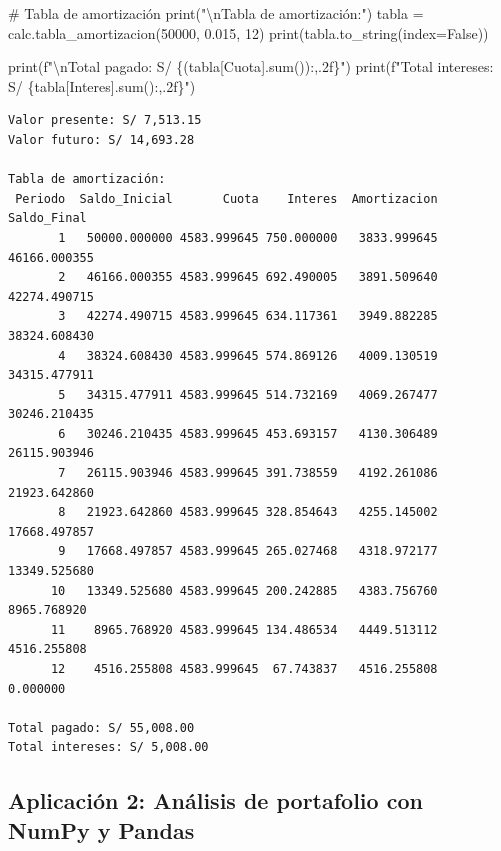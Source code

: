 \documentclass[
  doc,
  floatsintext,
  longtable,
  a4paper,
  nolmodern,
  notxfonts,
  notimes,
  12pt,
  colorlinks=true,linkcolor=blue,citecolor=blue,urlcolor=blue]{apa7}
\newenvironment{Shaded}{\begin{snugshade}}{\end{snugshade}}
\newcommand{\BuiltInTok}[1]{\textcolor[rgb]{0.00,0.23,0.31}{#1}}
\newcommand{\CharTok}[1]{\textcolor[rgb]{0.13,0.47,0.30}{#1}}
\newcommand{\CommentTok}[1]{\textcolor[rgb]{0.37,0.37,0.37}{#1}}
\newcommand{\DecValTok}[1]{\textcolor[rgb]{0.68,0.00,0.00}{#1}}
\newcommand{\FloatTok}[1]{\textcolor[rgb]{0.68,0.00,0.00}{#1}}
\newcommand{\NormalTok}[1]{\textcolor[rgb]{0.00,0.23,0.31}{#1}}
\newcommand{\OperatorTok}[1]{\textcolor[rgb]{0.37,0.37,0.37}{#1}}
\newcommand{\SpecialCharTok}[1]{\textcolor[rgb]{0.37,0.37,0.37}{#1}}
\newcommand{\SpecialStringTok}[1]{\textcolor[rgb]{0.13,0.47,0.30}{#1}}
\newcommand{\StringTok}[1]{\textcolor[rgb]{0.13,0.47,0.30}{#1}}
\newcommand{\VariableTok}[1]{\textcolor[rgb]{0.07,0.07,0.07}{#1}}
\begin{document}
\begin{Shaded}
\begin{Highlighting}[]
\CommentTok{\# Tabla de amortización}
\BuiltInTok{print}\NormalTok{(}\StringTok{"}\CharTok{\textbackslash{}n}\StringTok{Tabla de amortización:"}\NormalTok{)}
\NormalTok{tabla }\OperatorTok{=}\NormalTok{ calc.tabla\_amortizacion(}\DecValTok{50000}\NormalTok{, }\FloatTok{0.015}\NormalTok{, }\DecValTok{12}\NormalTok{)}
\BuiltInTok{print}\NormalTok{(tabla.to\_string(index}\OperatorTok{=}\VariableTok{False}\NormalTok{))}

\BuiltInTok{print}\NormalTok{(}\SpecialStringTok{f"}\CharTok{\textbackslash{}n}\SpecialStringTok{Total pagado: S/ }\SpecialCharTok{\{}\NormalTok{(tabla[}\StringTok{\textquotesingle{}Cuota\textquotesingle{}}\NormalTok{].}\BuiltInTok{sum}\NormalTok{())}\SpecialCharTok{:,.2f\}}\SpecialStringTok{"}\NormalTok{)}
\BuiltInTok{print}\NormalTok{(}\SpecialStringTok{f"Total intereses: S/ }\SpecialCharTok{\{}\NormalTok{tabla[}\StringTok{\textquotesingle{}Interes\textquotesingle{}}\NormalTok{]}\SpecialCharTok{.}\BuiltInTok{sum}\NormalTok{()}\SpecialCharTok{:,.2f\}}\SpecialStringTok{"}\NormalTok{)}
\end{Highlighting}
\end{Shaded}

\begin{verbatim}
Valor presente: S/ 7,513.15
Valor futuro: S/ 14,693.28

Tabla de amortización:
 Periodo  Saldo_Inicial       Cuota    Interes  Amortizacion  Saldo_Final
       1   50000.000000 4583.999645 750.000000   3833.999645 46166.000355
       2   46166.000355 4583.999645 692.490005   3891.509640 42274.490715
       3   42274.490715 4583.999645 634.117361   3949.882285 38324.608430
       4   38324.608430 4583.999645 574.869126   4009.130519 34315.477911
       5   34315.477911 4583.999645 514.732169   4069.267477 30246.210435
       6   30246.210435 4583.999645 453.693157   4130.306489 26115.903946
       7   26115.903946 4583.999645 391.738559   4192.261086 21923.642860
       8   21923.642860 4583.999645 328.854643   4255.145002 17668.497857
       9   17668.497857 4583.999645 265.027468   4318.972177 13349.525680
      10   13349.525680 4583.999645 200.242885   4383.756760  8965.768920
      11    8965.768920 4583.999645 134.486534   4449.513112  4516.255808
      12    4516.255808 4583.999645  67.743837   4516.255808     0.000000

Total pagado: S/ 55,008.00
Total intereses: S/ 5,008.00
\end{verbatim}

\subsection{Aplicación 2: Análisis de portafolio con NumPy y
Pandas}\label{aplicaciuxf3n-2-anuxe1lisis-de-portafolio-con-numpy-y-pandas}
\end{document}
